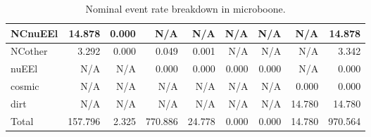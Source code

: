 \begin{table}
\begin{adjustbox}{width=1\textwidth}
\begin{tabular} {l r r r r r r r r}
        \\ \hline
 NCnuEEl      & 14.878               & 0.000                & N/A                  & N/A                  & N/A                  & N/A                  & N/A                  & 14.878       
        \\ \hline
 NCother      & 3.292                & 0.000                & 0.049                & 0.001                & N/A                  & N/A                  & N/A                  & 3.342        
        \\ \hline
 nuEEl        & N/A                  & N/A                  & 0.000                & 0.000                & 0.000                & 0.000                & N/A                  & 0.000        
        \\ \hline
 cosmic       & N/A                  & N/A                  & N/A                  & N/A                  & N/A                  & N/A                  & 0.000                & 0.000        
        \\ \hline
 dirt         & N/A                  & N/A                  & N/A                  & N/A                  & N/A                  & N/A                  & 14.780               & 14.780       
        \\ \hline
\hline
 Total        & 157.796              & 2.325                & 770.886              & 24.778               & 0.000                & 0.000                & 14.780               & 970.564      
        \\ \hline

\end{tabular}
\end{adjustbox}

\caption[Nominal \nue event rate breakdown in \gls{microboone}.]{Nominal \nue event rate breakdown in \gls{microboone}.}
\label{table:uboone_nue_event_rate}
\end{table}



